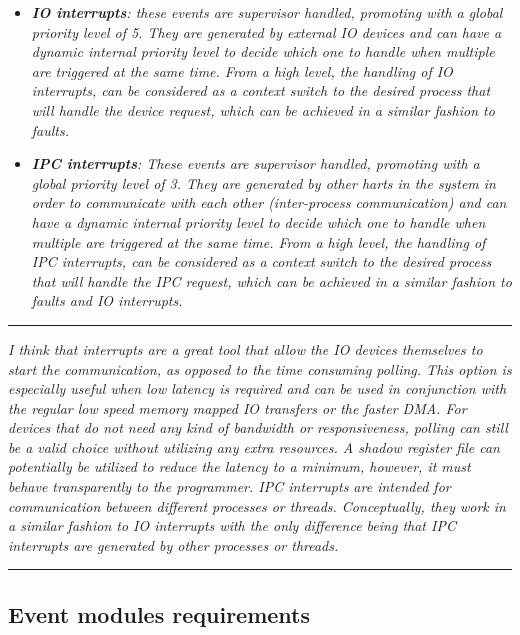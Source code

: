         \begin{itemize}

            \item \textit{\textbf{IO interrupts}: these events are supervisor handled, promoting with a global priority level of 5. They are generated by external IO devices and can have a dynamic internal priority level to decide which one to handle when multiple are triggered at the same time. From a high level, the handling of IO interrupts, can be considered as a context switch to the desired process that will handle the device request, which can be achieved in a similar fashion to faults.}

            \item \textit{\textbf{IPC interrupts}: These events are supervisor handled, promoting with a global priority level of 3. They are generated by other harts in the system in order to communicate with each other (inter-process communication) and can have a dynamic internal priority level to decide which one to handle when multiple are triggered at the same time. From a high level, the handling of IPC interrupts, can be considered as a context switch to the desired process that will handle the IPC request, which can be achieved in a similar fashion to faults and IO interrupts.}

        \end{itemize}

    \par\noindent\rule{\textwidth}{0.4pt}
    \textit{I think that interrupts are a great tool that allow the IO devices themselves to start the communication, as opposed to the time consuming polling. This option is especially useful when low latency is required and can be used in conjunction with the regular low speed memory mapped IO transfers or the faster DMA. For devices that do not need any kind of bandwidth or responsiveness, polling can still be a valid choice without utilizing any extra resources. A shadow register file can potentially be utilized to reduce the latency to a minimum, however, it must behave transparently to the programmer. IPC interrupts are intended for communication between different processes or threads. Conceptually, they work in a similar fashion to IO interrupts with the only difference being that IPC interrupts are generated by other processes or threads.}
    \par\noindent\rule{\textwidth}{0.4pt}

    \subsection{Event modules requirements}

